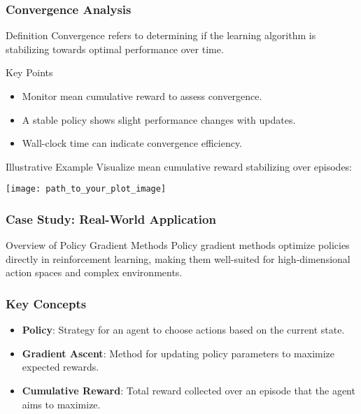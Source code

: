\documentclass[aspectratio=169]{beamer}
\begin{document}
\begin{frame}[fragile]
    \frametitle{Convergence Analysis}
    \begin{block}{Definition}
        Convergence refers to determining if the learning algorithm is stabilizing towards optimal performance over time.
    \end{block}
    
    \begin{block}{Key Points}
        \begin{itemize}
            \item Monitor mean cumulative reward to assess convergence.
            \item A stable policy shows slight performance changes with updates.
            \item Wall-clock time can indicate convergence efficiency.
        \end{itemize}
    \end{block}

    \begin{block}{Illustrative Example}
        Visualize mean cumulative reward stabilizing over episodes:
        \begin{center}
        \texttt{[image: path\_to\_your\_plot\_image]}
        \end{center}
    \end{block}
\end{frame}

\begin{frame}[fragile]
    \frametitle{Case Study: Real-World Application}
    \begin{block}{Overview of Policy Gradient Methods}
        Policy gradient methods optimize policies directly in reinforcement learning, making them well-suited for high-dimensional action spaces and complex environments.
    \end{block}
\end{frame}

\begin{frame}[fragile]
    \frametitle{Key Concepts}
    \begin{itemize}
        \item \textbf{Policy}: Strategy for an agent to choose actions based on the current state.
        \item \textbf{Gradient Ascent}: Method for updating policy parameters to maximize expected rewards.
        \item \textbf{Cumulative Reward}: Total reward collected over an episode that the agent aims to maximize.
    \end{itemize}
\end{frame}
\end{document}
